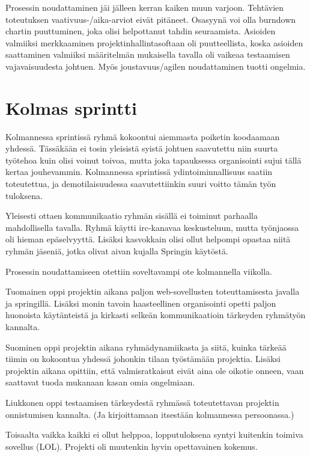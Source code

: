 \documentclass[10pt,a4paper]{article}
\begin{document}
Prosessin noudattaminen jäi jälleen kerran kaiken muun varjoon. Tehtävien
toteutuksen vaativuus-/aika-arviot eivät pitäneet. Osasyynä voi olla
burndown chartin puuttuminen, joka olisi helpottanut tahdin seuraamista.
Asioiden valmiiksi
merkkaaminen projektinhallintasoftaan oli puutteellista, koska asioiden
saattaminen valmiiksi määritelmän mukaisella tavalla oli vaikeaa
testaamisen vajavaisuudesta johtuen. Myös joustavuus/agilen noudattaminen
tuotti ongelmia. 

\section*{Kolmas sprintti}
Kolmannessa sprintissä ryhmä kokoontui aiemmasta poiketin koodaamaan
yhdessä. Tässäkään ei tosin yleisistä syistä johtuen saavutettu
niin suurta työtehoa kuin olisi voinut toivoa, mutta joka tapauksessa
organisointi sujui tällä kertaa jouhevammin. Kolmannessa sprintissä
ydintoiminnallisuus saatiin toteutettua, ja demotilaisuudessa
saavutettiinkin suuri voitto tämän työn tuloksena.

Yleisesti ottaen kommunikaatio ryhmän sisällä ei toiminut parhaalla
mahdollisella tavalla. Ryhmä käytti irc-kanavaa keskusteluun, mutta
työnjaossa oli hieman epäselvyyttä. Lisäksi kasvokkain olisi ollut
helpompi opastaa niitä ryhmän jäseniä, jotka olivat aivan kujalla
Springin käytöstä.

Prosessin noudattamiseen otettiin soveltavampi ote kolmannella viikolla. 

Tuomainen oppi projektin aikana paljon web-sovellusten toteuttamisesta
javalla ja springillä. Lisäksi monin tavoin haasteellinen organisointi
opetti paljon huonoista käytänteistä ja kirkasti selkeän
kommunikaatioin tärkeyden ryhmätyön kannalta.

Suominen oppi projektin aikana ryhmädynamiikasta ja siitä, kuinka
tärkeää tiimin on kokoontua yhdessä johonkin tilaan työstämään
projektia. Lisäksi projektin aikana opittiin, että valmisratkaisut eivät 
aina ole oikotie onneen, vaan saattavat tuoda mukanaan kasan omia ongelmiaan.

Liukkonen oppi testaamisen tärkeydestä ryhmässä toteutettavan projektin
onnistumisen kannalta. (Ja kirjoittamaan itsestään kolmannessa persoonassa.)

Toisaalta vaikka kaikki ei ollut helppoa, lopputuloksena syntyi kuitenkin
toimiva sovellus (LOL). Projekti oli muutenkin hyvin opettavainen kokemus.
\end{document}
